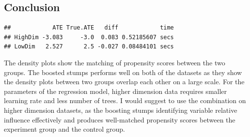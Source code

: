 \documentclass[]{article}
\newenvironment{Shaded}{\begin{snugshade}}{\end{snugshade}}
\newcommand{\DataTypeTok}[1]{\textcolor[rgb]{0.13,0.29,0.53}{#1}}
\newcommand{\DecValTok}[1]{\textcolor[rgb]{0.00,0.00,0.81}{#1}}
\newcommand{\KeywordTok}[1]{\textcolor[rgb]{0.13,0.29,0.53}{\textbf{#1}}}
\newcommand{\NormalTok}[1]{#1}
\newcommand{\OperatorTok}[1]{\textcolor[rgb]{0.81,0.36,0.00}{\textbf{#1}}}
\newcommand{\StringTok}[1]{\textcolor[rgb]{0.31,0.60,0.02}{#1}}
\begin{document}
\hypertarget{conclusion}{%
\subsection{Conclusion}\label{conclusion}}

\begin{Shaded}
\end{Shaded}

\begin{verbatim}
##            ATE True.ATE   diff            time
## HighDim -3.083     -3.0  0.083 0.52185607 secs
## LowDim   2.527      2.5 -0.027 0.08484101 secs
\end{verbatim}

The density plots show the matching of propensity scores between the two
groups. The boosted stumps performs well on both of the datasets as they
show the density plots between two groups overlap each other on a large
scale. For the parameters of the regression model, higher dimension data
requires smaller learning rate and less number of trees. I would suggest
to use the combination on higher dimension datasets, as the boosting
stumps identifying variable relative influence effectively and produces
well-matched propensity scores between the experiment group and the
control group.
\end{document}
